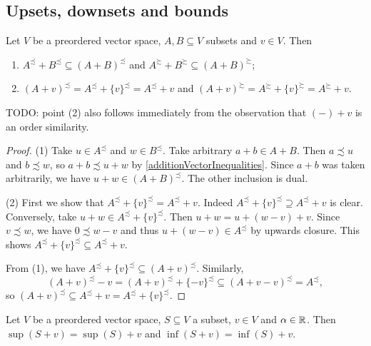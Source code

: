 \subsection{Upsets, downsets and bounds}
\begin{lemma} \label{sumUpperLowerBounds}
Let $V$ be a preordered vector space, $A, B\subseteq V$ subsets and $v\in V$. Then
\begin{enumerate}
\item $A^\precsim + B^\precsim \subseteq (A + B)^\precsim$ and $A^\succsim + B^\succsim \subseteq (A + B)^\succsim$;
\item $(A+v)^\precsim = A^\precsim + \{v\}^\precsim = A^\precsim + v$ and $(A+v)^\succsim = A^\succsim + \{v\}^\succsim = A^\succsim + v$.
\end{enumerate}
\end{lemma}
TODO: point (2) also follows immediately from the observation that $(-)+v$ is an order similarity.
\begin{proof}
(1) Take $u\in A^\precsim$ and $w\in B^\precsim$. Take arbitrary $a+b\in A+B$. Then $a\precsim u$ and $b\precsim w$, so $a+b \precsim u+w$ by \ref{additionVectorInequalities}. Since $a+b$ was taken arbitrarily, we have $u+w \in (A+B)^\precsim$. The other inclusion is dual.

(2) First we show that $A^\precsim + \{v\}^\precsim = A^\precsim + v$. Indeed $A^\precsim + \{v\}^\precsim \supseteq A^\precsim + v$ is clear. Conversely, take $u + w \in A^\precsim + \{v\}^\precsim$. Then $u+ w = u + (w-v) + v$. Since $v\precsim w$, we have $0\precsim w-v$ and thus $u + (w-v)\in A^\precsim$ by upwards closure. This shows $A^\precsim + \{v\}^\precsim \subseteq A^\precsim + v$.

From (1), we have $A^\precsim+ \{v\}^\precsim \subseteq (A+ v)^\precsim$. Similarly,
\[ (A+v)^\precsim - v = (A+v)^\precsim + \{-v\}^\precsim \subseteq (A+v - v)^\precsim = A^\precsim, \]
so $(A+v)^\precsim \subseteq A^\precsim + v = A^\precsim+ \{v\}^\precsim$.
\end{proof}
\begin{corollary} \label{vectorSumOrderHomomorphism}
Let $V$ be a preordered vector space, $S\subseteq V$ a subset, $v\in V$ and $\alpha\in \mathbb{R}$. Then $\sup(S+v) = \sup(S)+v$ and $\inf(S+v) = \inf(S)+v$.
\end{corollary}

